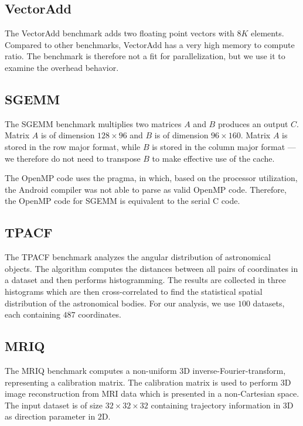 \subsection{VectorAdd}

The VectorAdd benchmark adds two floating point vectors with $8K$ elements.
Compared to other benchmarks, VectorAdd has a very high memory to compute ratio.
The benchmark is therefore not a fit for parallelization, but we use it to examine
  the overhead behavior.

\subsection{SGEMM}

The SGEMM benchmark multiplies two matrices $A$ and $B$ produces an output $C$.
Matrix $A$ is of dimension $128 \times 96$ and $B$ is of dimension $96 \times 160$.
Matrix $A$ is stored in the row major format, while $B$ is stored in the column major format ---
	we therefore do not need to transpose $B$ to make effective use of the cache.

The OpenMP code uses the 
	pragma, in which, based on the processor utilization,
	the Android compiler was not able to parse as valid OpenMP code.
Therefore, the OpenMP code for SGEMM is equivalent to the serial C code.

\subsection{TPACF}

The TPACF benchmark analyzes the angular distribution of astronomical objects.
The algorithm computes the distances between all pairs of coordinates in a dataset
	and then performs histogramming.
The results are collected in three histograms which are then cross-correlated to find
	the statistical spatial distribution of the astronomical bodies.
For our analysis, we use $100$ datasets, each containing $487$ coordinates.

\subsection{MRIQ}

The MRIQ benchmark computes a non-uniform 3D inverse-Fourier-transform, representing a calibration matrix.
The calibration matrix is used to perform 3D image reconstruction from MRI data which is 
	presented in a non-Cartesian space.
The input dataset is of size $32 \times 32 \times 32$ containing trajectory information in $3$D
	as direction parameter in $2$D.

